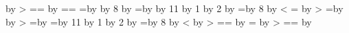 {{{  \advance\QRnumG by \QRBswitchCost
  \ifnum\exprB>\QRnumG
   \QRnumF=\QRnumG\QRnumC=\QRnumA\let\QRSchemaB=\QRSchemaN
  \else
   \advance\QRnumC by \QRnumA
  \fi 
 \fi
 \QRnumE=\QRinfty\QRnumD=\QRinfty
\else\ifx\prevQRtype\QRtypeA %
 \QRnumG=\QRnumC\advance\QRnumG by \QRnumA\multiply\QRnumG by 8 \advance\QRnumG by\QRnumF\edef\exprB{\the\QRnumG}%
 \QRnumG=\QRnumB\advance\QRnumG by \QRnumA\multiply\QRnumG by 11 \advance\QRnumG by 1 \divide\QRnumG by 2 \advance\QRnumG by \QRnumE
 \edef\exprA{\the\QRnumG\QRspace}%
 \QRnumG=\QRnumA\multiply\QRnumG by 8 \advance\QRnumG by\QRnumD
 \ifnum\exprA<\QRnumG
  \QRnumG=\exprA
  \advance\QRnumG by \QRBswitchCost
  \ifnum\exprB>\QRnumG
   \edef\futF{\QRnumF=\the\QRnumG\QRspace}\QRnumG=\QRnumB\advance\QRnumG by \QRnumA\edef\futQRSchemaB{\QRSchemaA A\the\QRnumG}\def\futC{\QRnumC=0 }%
  \else
   \let\futF=\relax\def\futC{\advance\QRnumC by \QRnumA}\let\futQRSchemaB=\QRSchemaB
  \fi
 \else
  \advance\QRnumG by \QRBswitchCost
  \ifnum\exprB>\QRnumG
   \QRnumG=\QRnumD\advance\QRnumG by \QRBswitchCost
   \edef\futF{\QRnumF=\the\QRnumG\QRspace}\def\futC{\QRnumC=\QRnumA}\let\futQRSchemaB=\QRSchemaN
  \else
   \let\futF=\relax\def\futC{\advance\QRnumC by \QRnumA}\let\futQRSchemaB=\QRSchemaB
  \fi
 \fi
 \QRnumG=\QRnumB\multiply\QRnumG by 11 \advance\QRnumG by 1 \divide\QRnumG by 2 \advance\QRnumG by \QRnumE\edef\exprA{\the\QRnumG}%
 \QRnumG=\QRnumC\multiply\QRnumG by 8 \advance\QRnumG by \QRnumF
 \ifnum\QRnumG<\QRnumD
  \advance\QRnumG by \QRAswitchCost
  \ifnum\exprA>\QRnumG
   \QRnumB=\QRnumA\edef\QRSchemaA{\QRSchemaB B\the\QRnumC}\QRnumE=\QRnumG
  \else
   \advance\QRnumB by \QRnumA
  \fi
 \else
  \QRnumG=\QRnumD
  \advance\QRnumG by \QRAswitchCost
  \ifnum\exprA>\QRnumG
   \QRnumB=\QRnumA\let\QRSchemaA=\QRSchemaN\QRnumE=\QRnumG
  \else
   \advance\QRnumB by \QRnumA
}}}
